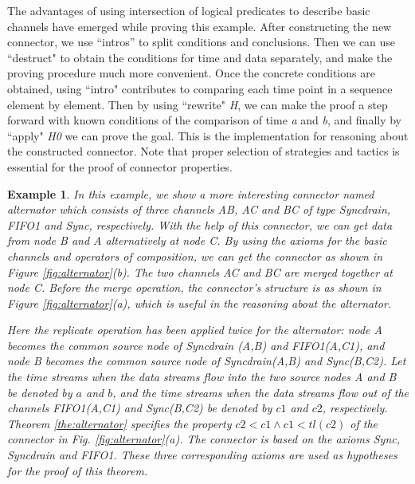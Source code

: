\documentclass[preprint,3p]{elsarticle}
\newtheorem{example}{Example}[section]
\begin{document}
The advantages of using intersection of logical predicates to describe basic channels have emerged while proving this example.
After constructing the new connector, we use ``intros'' to split conditions and conclusions. Then we can use ``destruct" to obtain the conditions for time and data separately,
and make the proving procedure much more convenient. Once the concrete conditions are obtained, using ``intro"
contributes to comparing each time point in a sequence element by element. Then by using ``rewrite" \emph{H}, we can make
the proof a step forward with known conditions of the comparison of time \emph{a} and \emph{b}, and finally by
``apply" \emph{H0} we can prove the goal. This is the implementation for reasoning about the constructed connector.
Note that proper selection of strategies and tactics is essential for the proof of connector properties.


\begin{example}\label{ex:alternator}
In this example, we show a more interesting connector named \emph{alternator} which consists of three channels \emph{AB}, \emph{AC} and \emph{BC} of type Syncdrain, FIFO1 and Sync, respectively. With the help of this connector, we can get data from node \emph{B} and \emph{A} alternatively at node \emph{C}.
By using the axioms for the basic channels and operators of composition, we can get the connector as shown in Figure \ref{fig:alternator}(b). The two
channels \emph{AC} and \emph{BC} are merged together at node \emph{C}. Before the merge operation, the connector's structure is as shown in
Figure \ref{fig:alternator}(a), which is useful in the reasoning about the alternator.

Here the replicate operation has been applied twice for the alternator: node \emph{A} becomes the common source node of \emph{Syncdrain (A,B)} and \emph{FIFO1(A,C1)}, and node \emph{B} becomes the common source node of \emph{Syncdrain(A,B)} and \emph{Sync(B,C2)}. Let the time streams when the
data streams flow into the two source nodes \emph{A} and \emph{B} be denoted by $a$ and $b$, and the time streams when the data streams
flow out of the channels \emph{FIFO1(A,C1)} and \emph{Sync(B,C2)} be denoted by $c1$ and $c2$, respectively. Theorem \ref{the:alternator}
specifies the property $c2<c1 \wedge c1<tl (c2)$ of the connector in Fig. \ref{fig:alternator}(a). The connector is based on the axioms
Sync, Syncdrain and FIFO1. These three corresponding axioms are used as hypotheses for the proof of this theorem.
\end{example}
\end{document}
